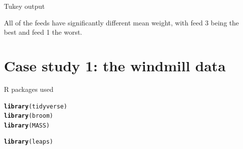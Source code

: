 \documentclass[unknownkeysallowed]{beamer}\usepackage[]{graphicx}\usepackage[]{color}
\makeatletter
\newcommand{\hlstd}[1]{\textcolor[rgb]{0.345,0.345,0.345}{#1}}%
\newcommand{\hlkwd}[1]{\textcolor[rgb]{0.737,0.353,0.396}{\textbf{#1}}}%
\newenvironment{kframe}{%
 \def\at@end@of@kframe{}%
 \ifinner\ifhmode%
  \def\at@end@of@kframe{\end{minipage}}%
  \begin{minipage}{\columnwidth}%
 \fi\fi%
 \def\FrameCommand##1{\hskip\@totalleftmargin \hskip-\fboxsep
 \colorbox{shadecolor}{##1}\hskip-\fboxsep
     \hskip-\linewidth \hskip-\@totalleftmargin \hskip\columnwidth}%
 \MakeFramed {\advance\hsize-\width
   \@totalleftmargin\z@ \linewidth\hsize
   \@setminipage}}%
 {\par\unskip\endMakeFramed%
 \at@end@of@kframe}
\newenvironment{knitrout}{}{} %
\makeatother
\begin{document}
\begin{frame}[fragile]{Tukey output}
  
  

All of the feeds have significantly different mean weight, with feed 3
being the best and feed 1 the worst.
\end{frame}



\section{Case study 1: the windmill data}

\frame{\sectionpage}


\begin{frame}[fragile]{R packages used}
  
\begin{knitrout}\scriptsize
{}\color{fgcolor}\begin{kframe}
\begin{alltt}
\hlkwd{library}\hlstd{(tidyverse)}
\hlkwd{library}\hlstd{(broom)}
\hlkwd{library}\hlstd{(MASS)}
\end{alltt}


{\ttfamily\noindent\itshape\color{messagecolor}{\#\# \\\#\# Attaching package: 'MASS'}}

{\ttfamily\noindent\itshape\color{messagecolor}{\#\# The following object is masked from 'package:dplyr':\\\#\# \\\#\#\ \ \ \  select}}\begin{alltt}
\hlkwd{library}\hlstd{(leaps)}
\end{alltt}
\end{kframe}
\end{knitrout}
  
\end{frame}
\end{document}

